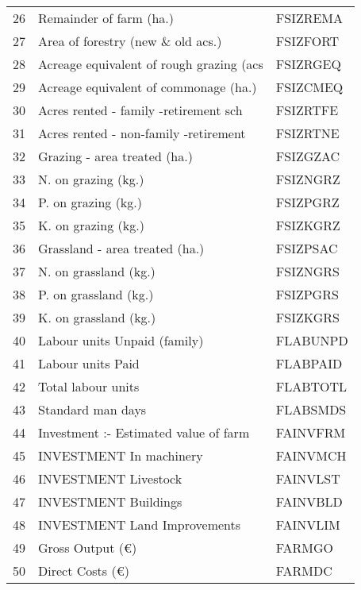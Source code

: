 \documentclass{article}\usepackage{graphicx, color}
\begin{document}
\begin{flushleft}
\begin{table}[ht]
\begin{center}
\begin{tabular}{rll}
  26 & Remainder of farm        (ha.) & FSIZREMA \\ 
  27 & Area of forestry (new \& old acs.) & FSIZFORT \\ 
  28 & Acreage equivalent of rough grazing (acs & FSIZRGEQ \\ 
  29 & Acreage equivalent of commonage (ha.) & FSIZCMEQ \\ 
  30 & Acres rented - family -retirement sch & FSIZRTFE \\ 
  31 & Acres rented - non-family -retirement & FSIZRTNE \\ 
  32 & Grazing - area treated   (ha.) & FSIZGZAC \\ 
  33 & N. on grazing    (kg.) & FSIZNGRZ \\ 
  34 & P. on grazing    (kg.) & FSIZPGRZ \\ 
  35 & K. on grazing    (kg.) & FSIZKGRZ \\ 
  36 & Grassland - area treated (ha.) & FSIZPSAC \\ 
  37 & N. on grassland  (kg.) & FSIZNGRS \\ 
  38 & P. on grassland  (kg.) & FSIZPGRS \\ 
  39 & K. on grassland  (kg.) & FSIZKGRS \\ 
  40 & Labour units  Unpaid (family) & FLABUNPD \\ 
  41 & Labour units  Paid & FLABPAID \\ 
  42 & Total labour units & FLABTOTL \\ 
  43 & Standard man days & FLABSMDS \\ 
  44 & Investment :- Estimated value of farm & FAINVFRM \\ 
  45 & INVESTMENT     In machinery & FAINVMCH \\ 
  46 & INVESTMENT     Livestock & FAINVLST \\ 
  47 & INVESTMENT     Buildings & FAINVBLD \\ 
  48 & INVESTMENT     Land Improvements & FAINVLIM \\ 
  49 & Gross Output                     (€) & FARMGO \\ 
  50 & Direct Costs                     (€) & FARMDC \\ 
   \hline
\end{tabular}
\end{center}
\end{table}



\end{flushleft}
\end{document}
